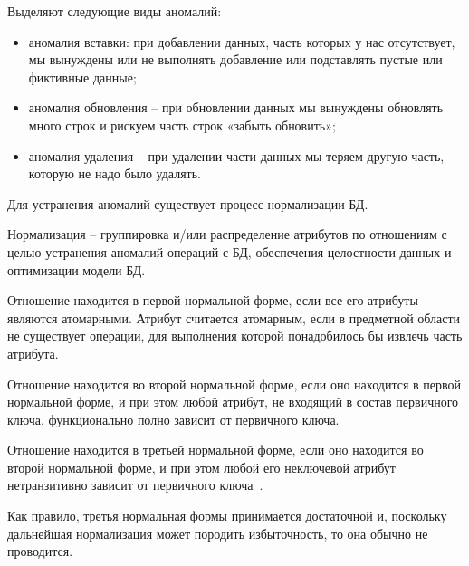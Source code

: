 Выделяют следующие виды аномалий:
\begin{itemize}
	\item аномалия вставки: при добавлении данных, часть которых у нас отсутствует, мы вынуждены или не выполнять
	добавление или подставлять пустые или фиктивные данные;
	\item аномалия обновления – при обновлении данных мы вынуждены обновлять много строк и рискуем часть строк
	«забыть обновить»;
	\item аномалия удаления – при удалении части данных мы теряем другую часть, которую не надо было удалять.
\end{itemize}

Для устранения аномалий существует процесс нормализации БД.

Нормализация -- группировка и/или распределение атрибутов по отношениям с целью устранения аномалий операций с БД,
обеспечения целостности данных и оптимизации модели БД.

Отношение находится в первой нормальной форме, если все его атрибуты являются атомарными. Атрибут считается
атомарным, если в предметной области не существует операции, для выполнения которой понадобилось бы извлечь часть атрибута.

Отношение находится во второй нормальной форме, если оно находится в первой нормальной форме, и при этом любой атрибут,
не входящий в состав первичного ключа, функционально полно зависит от первичного ключа.

Отношение находится в третьей нормальной форме, если оно находится во второй нормальной форме, и при этом любой его
неключевой атрибут нетранзитивно зависит от первичного ключа~\cite{kulikov_db_workbook}.

Как правило, третья нормальная формы принимается достаточной и, поскольку дальнейшая нормализация может породить
избыточность, то она обычно не проводится.

